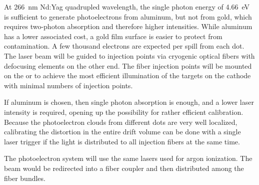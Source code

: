 At \SI{266}{\nano\m} Nd:Yag quadrupled wavelength, the single photon energy of \SI{4.66}{\eV} is sufficient to generate photoelectrons from aluminum, but not from gold, which requires two-photon absorption and therefore higher intensities.
While aluminum has a lower associated cost, a gold film surface is easier to protect from contamination. 
A few thousand electrons are expected per spill from each dot. The laser beam will be 
guided to injection points via cryogenic optical fibers with defocusing elements on the other end. The fiber injection points will be mounted on the  or  to achieve the most efficient illumination of the targets on the cathode with minimal numbers of injection points. 


If aluminum is chosen, then single photon absorption is enough, and a lower laser intensity is required, opening up the 
possibility for rather efficient calibration.
Because the photoelectron clouds from different dots are very well localized, calibrating the \efield distortion in the entire drift volume can be done with a single laser trigger if the light is distributed to all injection fibers at the same time. 

The photoelectron system will use the same lasers used for argon ionization. 
The beam would be redirected into a fiber coupler and then distributed among the fiber bundles.





